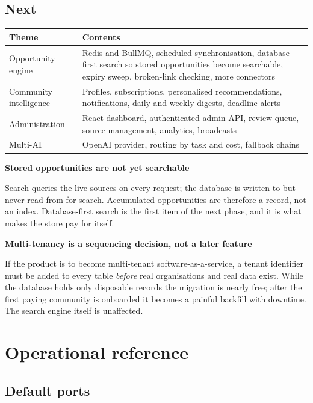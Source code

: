 \documentclass[11pt,a4paper]{report}
\newenvironment{callout}[1]
  {\begin{framed}\noindent\textbf{\textcolor{phcWarnInk}{#1}}\par\vspace{3pt}\small}
  {\end{framed}}
\begin{document}
\section{Next}

\begin{center}
\begin{tabularx}{\textwidth}{@{}lX@{}}
\toprule
\textbf{Theme} & \textbf{Contents} \\
\midrule
Opportunity engine & Redis and BullMQ, scheduled synchronisation,
database-first search so stored opportunities become searchable, expiry sweep,
broken-link checking, more connectors \\
Community intelligence & Profiles, subscriptions, personalised
recommendations, notifications, daily and weekly digests, deadline alerts \\
Administration & React dashboard, authenticated admin API, review queue,
source management, analytics, broadcasts \\
Multi-AI & OpenAI provider, routing by task and cost, fallback chains \\
\bottomrule
\end{tabularx}
\end{center}

\begin{callout}{Stored opportunities are not yet searchable}
Search queries the live sources on every request; the database is written to
but never read from for search. Accumulated opportunities are therefore a
record, not an index. Database-first search is the first item of the next
phase, and it is what makes the store pay for itself.
\end{callout}

\begin{callout}{Multi-tenancy is a sequencing decision, not a later feature}
If the product is to become multi-tenant software-as-a-service, a tenant
identifier must be added to every table \emph{before} real organisations and
real data exist. While the database holds only disposable records the migration
is nearly free; after the first paying community is onboarded it becomes a
painful backfill with downtime. The search engine itself is unaffected.
\end{callout}

\appendix
\chapter{Operational reference}

\section{Default ports}
\end{document}
